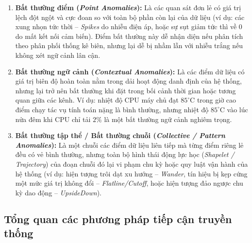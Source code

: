 \documentclass[11pt,journal,onecolumn]{IEEEtran}
\begin{document}
\begin{enumerate}
    \item \textbf{Bất thường điểm (\textit{Point Anomalies}):} 
    Là các quan sát đơn lẻ có giá trị lệch đột ngột và cực đoan so với toàn bộ phần còn lại của dữ liệu (ví dụ: các xung nhọn tức thời -- \textit{Spikes} do nhiễu điện áp, hoặc sự sụt giảm tức thì về 0 do mất kết nối cảm biến). Điểm bất thường này dễ nhận diện nếu phân tích theo phân phối thống kê biên, nhưng lại dễ bị nhầm lẫn với nhiễu trắng nếu không xét ngữ cảnh lân cận.
    
    \item \textbf{Bất thường ngữ cảnh (\textit{Contextual Anomalies}):} 
    Là các điểm dữ liệu có giá trị biên độ hoàn toàn nằm trong dải hoạt động danh định của hệ thống, nhưng lại trở nên bất thường khi đặt trong bối cảnh thời gian hoặc tương quan giữa các kênh. Ví dụ: nhiệt độ CPU máy chủ đạt $85^\circ\text{C}$ trong giờ cao điểm chạy tác vụ tính toán nặng là bình thường, nhưng nhiệt độ $85^\circ\text{C}$ vào lúc nửa đêm khi CPU chỉ tải $2\%$ là một bất thường ngữ cảnh nghiêm trọng.
    
    \item \textbf{Bất thường tập thể / Bất thường chuỗi (\textit{Collective / Pattern Anomalies}):} 
    Là một chuỗi các điểm dữ liệu liên tiếp mà từng điểm riêng lẻ đều có vẻ bình thường, nhưng toàn bộ hình thái động lực học (\textit{Shapelet / Trajectory}) của đoạn chuỗi đó lại vi phạm chu kỳ hoặc quy luật vận hành của hệ thống (ví dụ: hiện tượng trôi dạt xu hướng -- \textit{Wander}, tín hiệu bị kẹp cứng một mức giá trị không đổi -- \textit{Flatline/Cutoff}, hoặc hiện tượng đảo ngược chu kỳ dao động -- \textit{UpsideDown}).
\end{enumerate}

\subsection{Tổng quan các phương pháp tiếp cận truyền thống}
\end{document}
